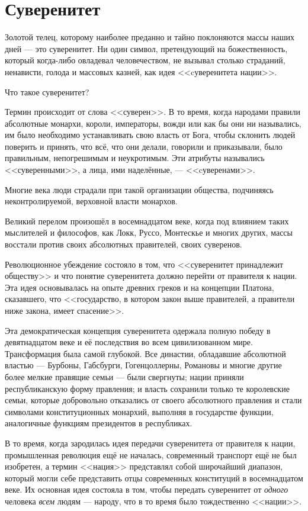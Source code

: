 \chapter{Суверенитет}

Золотой телец, которому наиболее преданно и тайно поклоняются массы наших дней — это суверенитет. Ни один символ, претендующий на божественность, который когда-либо овладевал человечеством, не вызывал столько страданий, ненависти, голода и массовых казней, как идея <<cуверенитета нации>>.
 
Что такое суверенитет?

Термин происходит от слова <<суверен>>. В то время, когда народами правили абсолютные монархи, короли, императоры, вожди или как бы они ни назывались, им было необходимо устанавливать свою власть от Бога, чтобы склонить людей поверить и принять, что всё, что они делали, говорили и приказывали, было правильным, непогрешимым и неукротимым. Эти атрибуты назывались <<суверенными>>, а лица, ими наделённые, — <<cуверенами>>.

Многие века люди страдали при такой организации общества, подчиняясь неконтролируемой, верховной власти монархов.

Великий перелом произошёл в восемнадцатом веке, когда под влиянием таких мыслителей и философов, как Локк, Руссо, Монтескье и многих других, массы восстали против своих абсолютных правителей, своих суверенов.

Революционное убеждение состояло в том, что <<суверенитет принадлежит обществу>> и что понятие суверенитета должно перейти от правителя к нации. Эта идея основывалась на опыте древних греков и на концепции Платона, сказавшего, что <<государство, в котором закон выше правителей, а правители ниже закона, имеет спасение>>.

Эта демократическая концепция суверенитета одержала полную победу в девятнадцатом веке и её последствия во всем цивилизованном мире. Трансформация была самой глубокой. Все династии, обладавшие абсолютной властью — Бурбоны, Габсбурги, Гогенцоллерны, Романовы и многие другие более мелкие правящие семьи — были свергнуты; нации приняли республиканскую форму правления; и власть сохранили только те королевские семьи, которые добровольно отказались от своего абсолютного правления и стали символами конституционных монархий, выполняя в государстве функции, аналогичные функциям президентов в республиках.

В то время, когда зародилась идея передачи суверенитета от правителя к нации, промышленная революция ещё не началась, современный транспорт ещё не был изобретен, а термин <<нация>> представлял собой широчайший диапазон, который могли себе представить отцы современных конституций в восемнадцатом веке. Их основная идея состояла в том, чтобы передать суверенитет от \textit{одного} человека \textit{всем} людям — народу, что в то время было тождественно <<нации>>.

